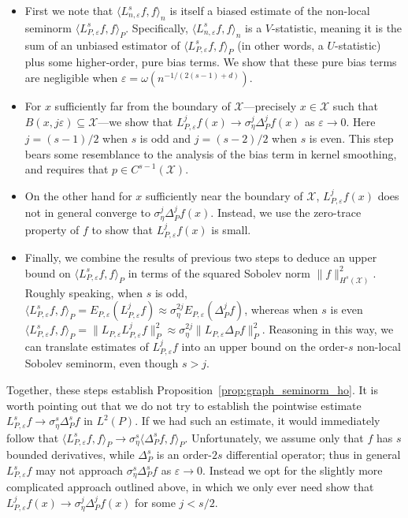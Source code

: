 \documentclass{article}
\newcommand{\1}{\mathbf{1}}
\newcommand{\mc}[1]{\mathcal{#1}}
\newcommand{\dotp}[2]{\langle #1, #2 \rangle}
\theoremstyle{alden}
\theoremstyle{aldenthm}
\theoremstyle{definition}
\theoremstyle{remark}
\begin{document}
\begin{itemize}
	\item First we note that $\dotp{L_{n,\varepsilon}^s f}{f}_n$ is itself a biased estimate of the non-local seminorm $\dotp{L_{P,\varepsilon}^sf}{f}_{P}$. Specifically, $\dotp{L_{n,\varepsilon}^s f}{f}_n$ is a $V$-statistic, meaning it is the sum of an unbiased estimator of $\dotp{L_{P,\varepsilon}^sf}{f}_{P}$ (in other words, a $U$-statistic) plus some higher-order, pure bias terms. We show that these pure bias terms are negligible when $\varepsilon = \omega(n^{-1/(2(s - 1) + d)})$. 
	\item For $x$ sufficiently far from the boundary of $\mc{X}$---precisely $x \in \mc{X}$ such that $B(x,j\varepsilon) \subseteq \mc{X}$---we show that $L_{P,\varepsilon}^jf(x) \to \sigma_{\eta}^j \Delta_P^jf(x)$ as $\varepsilon \to 0$. Here $j = (s - 1)/2$ when $s$ is odd and $j = (s - 2)/2$ when $s$ is even. This step bears some resemblance to the analysis of the bias term in kernel smoothing, and requires that $p \in C^{s-1}(\mc{X})$.
	\item On the other hand for $x$ sufficiently near the boundary of $\mc{X}$, $L_{P,\varepsilon}^jf(x)$ does not in general converge to $\sigma_{\eta}^j\Delta_P^jf(x)$. Instead, we use the zero-trace property of $f$ to show that $L_{P,\varepsilon}^jf(x)$ is small.
	\item Finally, we combine the results of previous two steps to deduce an upper bound on $\dotp{L_{P,\varepsilon}^sf}{f}_{P}$ in terms of the squared Sobolev norm $\|f\|_{H^s(\mc{X})}^2$.  Roughly speaking, when $s$ is odd, $\dotp{L_{P,\varepsilon}^sf}{f}_P = E_{P,\varepsilon}(L_{P,\varepsilon}^jf) \approx \sigma_{\eta}^{2j}E_{P,\varepsilon}(\Delta_P^jf)$, whereas when $s$ is even $\dotp{L_{P,\varepsilon}^sf}{f}_P = \|L_{P,\varepsilon}L_{P,\varepsilon}^{j}f\|_{P}^2 \approx \sigma_{\eta}^{2j}\|L_{P,\varepsilon} \Delta_Pf\|_P^2$. Reasoning in this way, we can translate estimates of $L_{P,\varepsilon}^jf$ into an upper bound on the order-$s$ non-local Sobolev seminorm, even though $s > j$.
\end{itemize}
Together, these steps establish Proposition~\ref{prop:graph_seminorm_ho}. It is worth pointing out that we do not try to establish the pointwise estimate $L_{P,\varepsilon}^sf \to \sigma_{\eta}^s\Delta_{P}^sf$ in $L^2(P)$. If we had such an estimate, it would immediately follow that $\dotp{L_{P,\varepsilon}^sf}{f}_{P} \to \sigma_{\eta}^s\dotp{\Delta_P^sf}{f}_{P}$. Unfortunately, we assume only that $f$ has $s$ bounded derivatives, while $\Delta_P^s$ is an order-$2s$ differential operator; thus in general $L_{P,\varepsilon}^sf$ may not approach $\sigma_{\eta}^s\Delta_{P}^sf$ as $\varepsilon \to 0$. Instead we opt for the slightly more complicated approach outlined above, in which we only ever need show that $L_{P,\varepsilon}^jf(x) \to \sigma_{\eta}^j \Delta_P^jf(x)$ for some $j < s/2$. 
\end{document}
